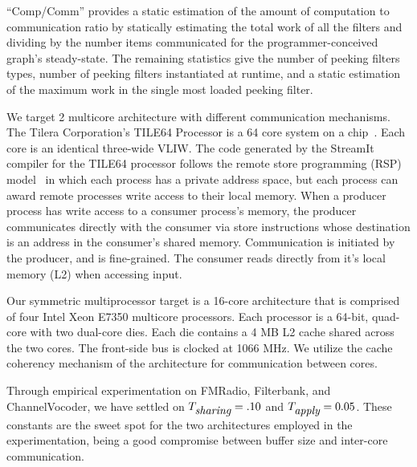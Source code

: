 \noindent ``Comp/Comm'' provides a static estimation of the
amount of computation to communication ratio by statically estimating the total
work of all the filters and dividing by the number items communicated
for the programmer-conceived graph's steady-state.  The remaining
statistics give the number of peeking filters types, number of peeking
filters instantiated at runtime, and a static estimation of the maximum
work in the single most loaded peeking filter.

We target 2 multicore architecture with different communication
mechanisms.  The Tilera Corporation's TILE64 Processor is a 64 core
system on a chip~\cite{tilera}.  Each core is an identical three-wide
VLIW. The code generated by the StreamIt
compiler for the TILE64 processor follows the remote store programming
(RSP) model~\cite{rsp10} in which each process has a private address
space, but each process can award remote processes write access to
their local memory. When a producer process has write access to a
consumer process's memory, the producer communicates directly with the
consumer via store instructions whose destination is an address in the
consumer's shared memory.  Communication is initiated by the producer,
and is fine-grained.  The consumer reads directly from it's local
memory (L2) when accessing input.

Our symmetric multiprocessor target is a 16-core architecture that is
comprised of four Intel Xeon E7350 multicore processors.  Each processor
is a 64-bit, quad-core with two dual-core dies.  Each die contains a 4
MB L2 cache shared across the two cores.  The front-side bus is clocked
at 1066 MHz.  We utilize the cache coherency mechanism of the
architecture for communication between cores. 

Through empirical experimentation on FMRadio, Filterbank, and
ChannelVocoder, we have settled on $T_{\mbox{\it sharing}} =.10$ and
$T_{\mbox{\it apply}} = 0.05$. These constants are the sweet spot for the two
architectures employed in the experimentation, being a good compromise
between buffer size and inter-core communication.


